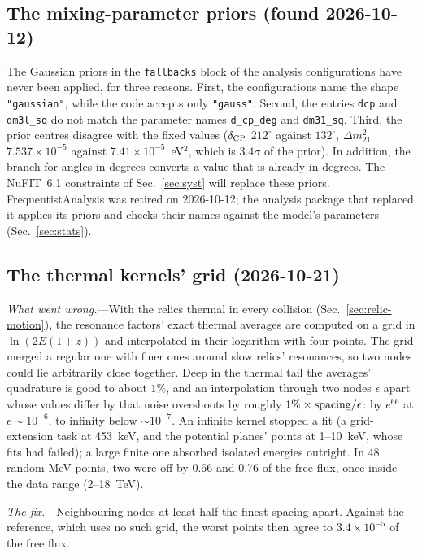 \documentclass[11pt,a4paper]{article}
\begin{document}
\subsection{The mixing-parameter priors (found 2026-10-12)}
\label{app:priors}

The Gaussian priors in the \texttt{fallbacks} block of the analysis configurations have never
been applied, for three reasons. First, the configurations name the shape \texttt{"gaussian"}, while
the code accepts only \texttt{"gauss"}. Second, the entries \texttt{dcp} and \texttt{dm3l\_sq}
do not match the parameter names \texttt{d\_cp\_deg} and \texttt{dm31\_sq}. Third, the prior
centres disagree with the fixed values ($\delta_{\rm CP}$ $212^\circ$ against $132^\circ$,
$\Delta m^2_{21}$ $7.537\times10^{-5}$ against $7.41\times10^{-5}$~eV$^2$, which is $3.4\sigma$
of the prior). In addition, the branch for angles in degrees converts a value that is already
in degrees. The NuFIT~6.1 constraints of Sec.~\ref{sec:syst} will replace these priors.
FrequentistAnalysis was retired on 2026-10-12; the analysis package that replaced it applies its
priors and checks their names against the model's parameters (Sec.~\ref{sec:stats}).

\subsection{The thermal kernels' grid (2026-10-21)}
\label{app:kernelgrid}

\textit{What went wrong.}---With the relics thermal in every collision (Sec.~\ref{sec:relic-motion}),
the resonance factors' exact thermal averages are computed on a grid in $\ln(2E(1+z))$ and
interpolated in their logarithm with four points. The grid merged a regular one with finer ones
around slow relics' resonances, so two nodes could lie arbitrarily close together. Deep in the
thermal tail the averages' quadrature is good to about $1\%$, and an interpolation through two nodes
$\epsilon$ apart whose values differ by that noise overshoots by roughly $1\%\times{\rm spacing}/\epsilon$:
by $e^{66}$ at $\epsilon\sim10^{-6}$, to infinity below $\sim10^{-7}$. An infinite kernel stopped a
fit (a grid-extension task at 453~keV, and the potential planes' points at 1--10~keV, whose fits had
failed); a large finite one absorbed isolated energies outright. In 48 random MeV points, two were off
by 0.66 and 0.76 of the free flux, once inside the data range (2--18~TeV).

\textit{The fix.}---Neighbouring nodes at least half the finest spacing apart. Against the reference,
which uses no such grid, the worst points then agree to $3.4\times10^{-5}$ of the free flux.
\end{document}
